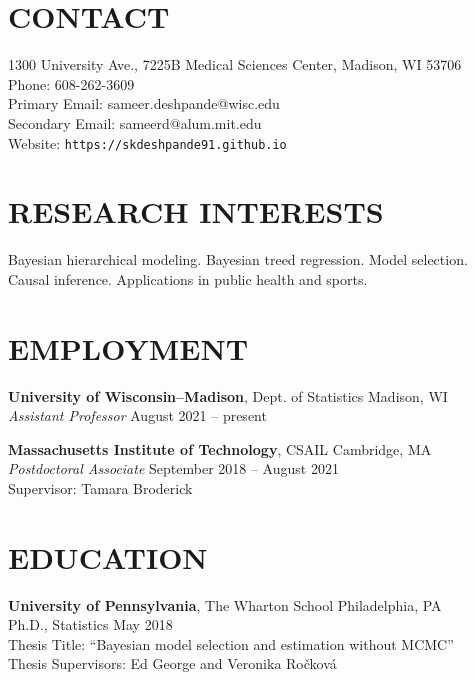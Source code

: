 \documentclass[margin]{res}
\begin{document}
  
                        
\begin{resume}                        
  
  \section{CONTACT} 
  1300 University Ave., 7225B Medical Sciences Center, Madison, WI 53706 \\
  Phone: 608-262-3609 \\ 
  Primary Email: sameer.deshpande@wisc.edu \\
  Secondary Email: sameerd@alum.mit.edu \\
  Website: \texttt{https://skdeshpande91.github.io}

  \section{RESEARCH INTERESTS}
  Bayesian hierarchical modeling. Bayesian treed regression. Model selection. Causal inference. Applications in public health and sports. 
              
\section{EMPLOYMENT} 

\textbf{University of Wisconsin--Madison}, Dept. of Statistics \hfill Madison, WI \\
\textit{Assistant Professor} \hfill August 2021 -- present

\textbf{Massachusetts Institute of Technology}, CSAIL \hfill Cambridge, MA \\
\emph{Postdoctoral Associate} \hfill September 2018 -- August 2021 \\
Supervisor: Tamara Broderick
              
\section{EDUCATION}      
                {\bf University of Pennsylvania}, The Wharton School \hfill Philadelphia, PA \\
                Ph.D., Statistics \hfill May 2018 \\
		Thesis Title: ``Bayesian model selection and estimation without MCMC'' \\
		Thesis Supervisors: Ed George and Veronika Ro\v{c}kov\'{a}
                

\end{resume}
\end{document}
